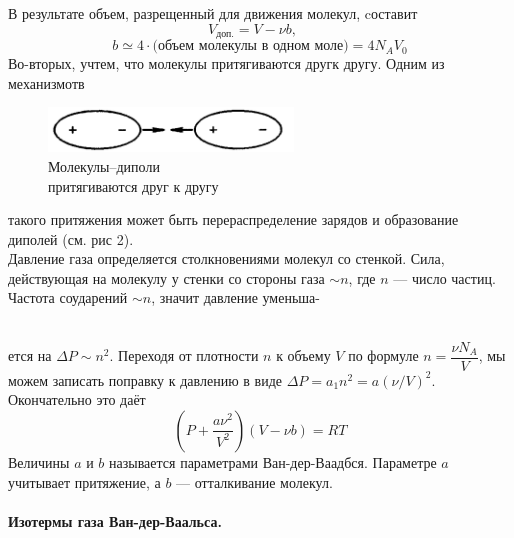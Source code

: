 В результате объем, разрещенный для движения молекул, cоставит
$$V_\text{доп.} =V-\nu b,\quad$$
$$ b\simeq4\cdot\text{(объем молекулы в одном моле)}=4N_AV_0$$
Во-вторых, учтем, что молекулы притягиваются другк другу. Одним из механизмотв 
\begin{minipage}{65mm}
	\begin{figure}[H]
		\label{dipol}
		\includegraphics[width=65mm]{ris19_2.png}
		\caption{Молекулы--диполи \\притягиваются друг к другу}
	\end{figure}
\end{minipage}
\begin{minipage}{5mm}
	\quad
\end{minipage}
\begin{minipage}{100mm}
	такого притяжения может быть перераспределение зарядов и образование диполей (см. рис 2).\\
	Давление газа определяется столкновениями молекул со стенкой. Сила, действующая на молекулу у стенки со стороны газа $\sim n$, где $n$ --- число частиц. Частота соударений $\sim n$, значит давление уменьша-
\end{minipage}\\[1mm]
ется на $\Delta P\sim n^2$. Переходя от плотности $n$ к объему $V$ по формуле $n=\dfrac{\nu N_A}{V}$, мы можем записать поправку к давлению в виде $\Delta P=a_1n^2=a(\nu/V)^2.$ Окончательно это даёт
$$\left(P+\dfrac{a\nu^2}{V^2}\right)\left(V-\nu b\right)=RT$$
Величины $a$ и $b$ называется параметрами Ван-дер-Ваадбся. Параметре $a$ учитывает притяжение, а $b$ --- отталкивание молекул.
\paragraph{Изотермы газа Ван-дер-Ваальса.}